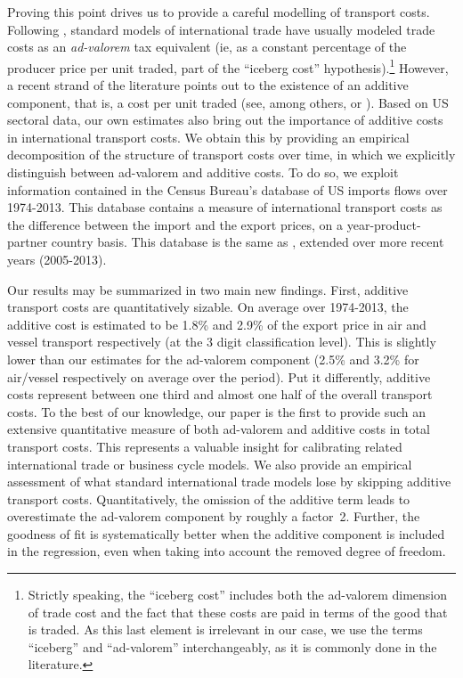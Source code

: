 \documentclass[a4paper,11pt]{article}
\begin{document}
Proving this point drives us to provide a careful modelling of transport costs.
Following \citet{samuelson1954}, standard models of international trade have usually modeled trade costs as an \emph{ad-valorem} tax equivalent (ie, as a constant percentage of the producer price per unit traded, part of the ``iceberg cost'' hypothesis).\footnote{Strictly speaking, the ``iceberg cost'' includes both the ad-valorem dimension of trade cost and the fact that these costs are paid in terms of the good that is traded.
As this last element is irrelevant in our case, we use the terms ``iceberg'' and ``ad-valorem'' interchangeably, as it is commonly done in the literature.} However, a recent strand of the literature points out to the existence of an additive component, that is, a cost per unit traded (see, among others, \citealp{Irrazabal_2015} or \citealp{martin2012}).
Based on US sectoral data, our own estimates also bring out the importance of additive costs in international transport costs.
We obtain this by providing an empirical decomposition of the structure of transport costs over time, in which we explicitly distinguish between ad-valorem and additive costs.
To do so, we exploit information contained in the Census Bureau's database of US imports flows over 1974-2013.
This database contains a measure of international transport costs as the difference between the import and the export prices, on a year-product-partner country basis.
This database is the same as \cite{hummels2007}, extended over more recent years (2005-2013).
\smallskip

Our results may be summarized in two main new findings.
First, additive transport costs are quantitatively sizable.
On average over 1974-2013, the additive cost is estimated to be 1.8\% and 2.9\% of the export price in air and vessel transport respectively (at the 3 digit classification level). This is slightly lower than our estimates for the ad-valorem component (2.5\% and 3.2\% for air/vessel respectively on average over the period).
Put it differently, additive costs represent between one third and almost one half of the overall transport costs.
To the best of our knowledge, our paper is the first to provide such an extensive quantitative measure of both ad-valorem and additive costs in total transport costs.
This represents a valuable insight for calibrating related international trade or business cycle models.
We also provide an empirical assessment of what standard international trade models lose by skipping additive transport costs.
Quantitatively, the omission of the additive term leads to overestimate the ad-valorem component by roughly a factor~2. Further, the goodness of fit is systematically better when the additive component is included in the regression, even when taking into account the removed degree of freedom.\smallskip
\end{document}
